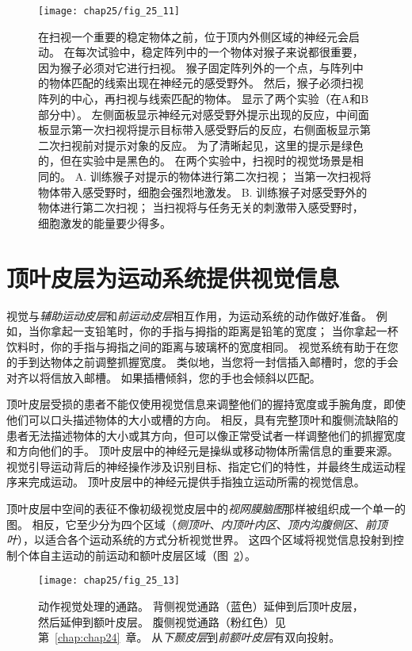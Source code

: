 \begin{figure}[htbp]
	\centering
	\texttt{[image: chap25/fig\_25\_11]}
	\caption{在扫视一个重要的稳定物体之前，位于顶内外侧区域的神经元会启动。
		在每次试验中，稳定阵列中的一个物体对猴子来说都很重要，因为猴子必须对它进行扫视。
		猴子固定阵列外的一个点，与阵列中的物体匹配的线索出现在神经元的感受野外。
		然后，猴子必须扫视阵列的中心，再扫视与线索匹配的物体。
		显示了两个实验（在A和B部分中）。
		左侧面板显示神经元对感受野外提示出现的反应，中间面板显示第一次扫视将提示目标带入感受野后的反应，右侧面板显示第二次扫视前对提示对象的反应。
		为了清晰起见，这里的提示是绿色的，但在实验中是黑色的。
		在两个实验中，扫视时的视觉场景是相同的。
		A. 训练猴子对提示的物体进行第二次扫视；
		当第一次扫视将物体带入感受野时，细胞会强烈地激发。
		B. 训练猴子对感受野外的物体进行第二次扫视；
		当扫视将与任务无关的刺激带入感受野时，细胞激发的能量要少得多。}
	\label{fig:25_12}
\end{figure}



\section{顶叶皮层为运动系统提供视觉信息}

视觉与\textit{辅助运动皮层}和\textit{前运动皮层}相互作用，为运动系统的动作做好准备。
例如，当你拿起一支铅笔时，你的手指与拇指的距离是铅笔的宽度；
当你拿起一杯饮料时，你的手指与拇指之间的距离与玻璃杯的宽度相同。
视觉系统有助于在您的手到达物体之前调整抓握宽度。
类似地，当您将一封信插入邮槽时，您的手会对齐以将信放入邮槽。
如果插槽倾斜，您的手也会倾斜以匹配。


顶叶皮层受损的患者不能仅使用视觉信息来调整他们的握持宽度或手腕角度，即使他们可以口头描述物体的大小或槽的方向。
相反，具有完整顶叶和腹侧流缺陷的患者无法描述物体的大小或其方向，但可以像正常受试者一样调整他们的抓握宽度和方向他们的手。
顶叶皮层中的神经元是操纵或移动物体所需信息的重要来源。
视觉引导运动背后的神经操作涉及识别目标、指定它们的特性，并最终生成运动程序来完成运动。
顶叶皮层中的神经元提供手指独立运动所需的视觉信息。


顶叶皮层中空间的表征不像初级视觉皮层中的\textit{视网膜脑图}那样被组织成一个单一的图。
相反，它至少分为四个区域（\textit{侧顶叶}、\textit{内顶叶内区}、\textit{顶内沟腹侧区}、\textit{前顶叶}），以适合各个运动系统的方式分析视觉世界。
这四个区域将视觉信息投射到控制个体自主运动的前运动和额叶皮层区域（图~\ref{fig:25_13}）。


\begin{figure}[htbp]
	\centering
	\texttt{[image: chap25/fig\_25\_13]}
	\caption{动作视觉处理的通路。
		背侧视觉通路（蓝色）延伸到后顶叶皮层，然后延伸到额叶皮层。
		腹侧视觉通路（粉红色）见第~\ref{chap:chap24}~章。
		从\textit{下颞皮层}到\textit{前额叶皮层}有双向投射。}
	\label{fig:25_13}
\end{figure}


